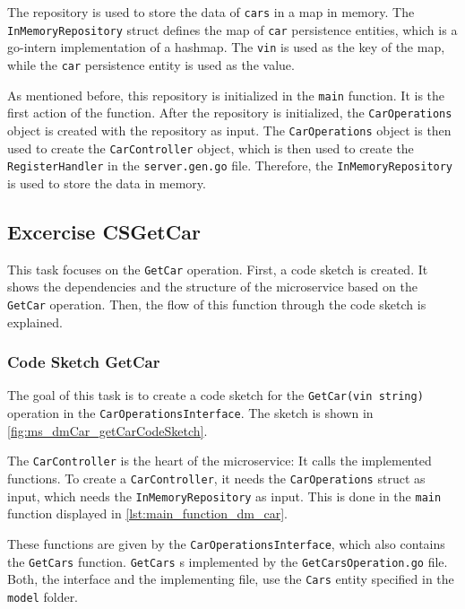 The repository is used to store the data of \texttt{cars} in a map in memory.
The \texttt{InMemoryRepository} struct defines the map of \texttt{car} persistence entities, which is a go-intern implementation of a hashmap.
The \texttt{vin} is used as the key of the map, while the \texttt{car} persistence entity is used as the value.

As mentioned before, this repository is initialized in the \texttt{main} function.
It is the first action of the function.
After the repository is initialized, the \texttt{CarOperations} object is created with the repository as input.
The \texttt{CarOperations} object is then used to create the \texttt{CarController} object, which is then used to create the \texttt{RegisterHandler} in the \texttt{server.gen.go} file.
Therefore, the \texttt{InMemoryRepository} is used to store the data in memory.

\subsection{Excercise CSGetCar}
This task focuses on the \texttt{GetCar} operation.
First, a code sketch is created.
It shows the dependencies and the structure of the microservice based on the \texttt{GetCar} operation.
Then, the flow of this function through the code sketch is explained.

\subsubsection*{Code Sketch GetCar}
The goal of this task is to create a code sketch for the \texttt{GetCar(vin string)} operation in the \texttt{CarOperationsInterface}.
The sketch is shown in \autoref{fig:ms_dmCar_getCarCodeSketch}.

The \texttt{CarController} is the heart of the microservice:
It calls the implemented functions.
To create a \texttt{CarController}, it needs the \texttt{CarOperations} struct as input, which needs the \texttt{InMemoryRepository} as input.
This is done in the \texttt{main} function displayed in \autoref{lst:main_function_dm_car}.

These functions are given by the \texttt{CarOperationsInterface}, which also contains the \texttt{GetCars} function.
\texttt{GetCars} s implemented by the \texttt{GetCarsOperation.go} file.
Both, the interface and the implementing file, use the \texttt{Cars} entity specified in the \texttt{model} folder.

